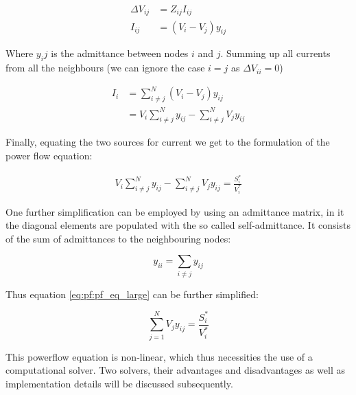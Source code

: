 \begin{equation}
    \begin{aligned}
        \Delta V_{ij} &= Z_{ij} I_{ij} \\
        I_{ij}        &= (V_i - V_j) y_{ij}
    \end{aligned}
\end{equation}

Where $y_ij$ is the admittance between nodes $i$ and $j$.
Summing up all currents from all the neighbours (we can ignore the case $i = j$ as $\Delta V_{ii} = 0$)

\begin{equation}
    \begin{aligned}
        I_{i} &= \sum_{i \ne j}^N (V_i - V_j) y_{ij}\\
              &= V_i \sum_{i \ne j}^N y_{ij} - \sum_{i \ne j}^N V_j y_{ij}
        \label{eq:pf:current_at_node}
    \end{aligned}
\end{equation}

Finally, equating the two sources for current we get to the formulation of the power flow
equation:

\begin{equation}
    \begin{aligned}
        V_i \sum_{i \ne j}^N y_{ij} - \sum_{i \ne j}^N V_j y_{ij} = \frac{S_i^*}{V_i^*}
        \label{eq:pf:pf_eq_large}
    \end{aligned}
\end{equation}

One further simplification can be employed by using an admittance matrix, in it the diagonal elements are populated with the
so called self-admittance. It consists of the sum of admittances to the neighbouring nodes:

\begin{equation}
    y_{ii} = \sum_{i \ne j} y_{ij}
\end{equation}

Thus equation \ref{eq:pf:pf_eq_large} can be further simplified:

\begin{equation}
    \sum_{j=1}^N V_j y_{ij} = \frac{S_i^*}{V_i^*}
    \label{eq:pf:full_pf_eq}
\end{equation}

This powerflow equation is non-linear, which thus necessities the use of a computational
solver. Two solvers, their advantages and disadvantages as well as implementation details will
be discussed subsequently.\\

